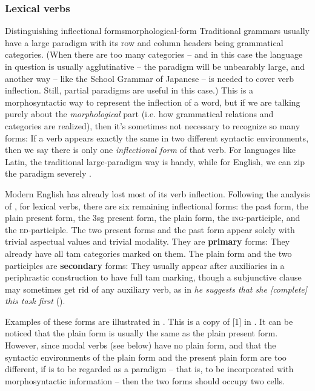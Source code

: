\documentclass[UTF8, a4paper, oneside, scheme=plain]{ctexrep}
\newcommand*{\citesec}[1]{\S~{#1}}
\newcommand*{\citechap}[1]{Ch~{#1}}
\newcommand*{\citechapsec}[2]{\citechap{#1}.\citesec{#2}}
\newcommand*{\concept}[1]{\textbf{#1}}
\newcommand{\corpus}[1]{\emph{#1}}
\newcommand{\corpuscat}[1]{\textsc{#1}}
\begin{document}
\subsubsection{Lexical verbs}

\begin{theorybox}{Distinguishing inflectional forms}{morphological-form}
    Traditional grammars usually have a large paradigm
    with its row and column headers being grammatical categories.
    (When there are too many categories 
    -- and in this case the language in question is usually agglutinative -- 
    the paradigm will be unbearably large, 
    and another way -- like the School Grammar of Japanese -- is needed to cover verb inflection.
    Still, partial paradigms are useful in this case.) 
    This is a morphosyntactic way to represent the inflection of a word, 
    but if we are talking purely about the \emph{morphological} part
    (i.e. how grammatical relations and categories are realized),
    then it's sometimes not necessary to recognize so many forms:
    If a verb appears exactly the same in two different syntactic environments,
    then we say there is only one \emph{inflectional form} of that verb.
    For languages like Latin, 
    the traditional large-paradigm way is handy,
    while for English, we can zip the paradigm severely \citep[\citechapsec{3}{1.2}]{cgel}.
\end{theorybox}

Modern English has already lost most of its verb inflection.
Following the analysis of \citet[\citechapsec{3}{1.1}]{cgel},
for lexical verbs,
there are six remaining inflectional forms: 
the past form, the plain present form, 
the 3sg present form,
the plain form, the \corpuscat{ing}-participle,
and the \corpuscat{ed}-participle.
The two present forms and the past form appear solely 
with trivial aspectual values and trivial modality.
They are \concept{primary} forms:
They already have all \acs{tam} categories marked on them.
The plain form and the two participles are \concept{secondary} forms:
They usually appear after auxiliaries 
in a periphrastic construction to have full \acs{tam} marking,
though a subjunctive clause may sometimes get rid of any auxiliary verb,
as in \corpus{he suggests that she [complete] this task first} ().

Examples of these forms are illustrated in . 
This is a copy of [1] in \citet[\citesec{1.1}]{cgel}.
It can be noticed that the plain form is usually the same as the plain present form.
However, since modal verbs (see below) have no plain form,
and that the syntactic environments of the plain form and the present plain form are too different,
if  is to be regarded as a paradigm
-- that is, to be incorporated with morphosyntactic information -- 
then the two forms should occupy two cells.
\end{document}
